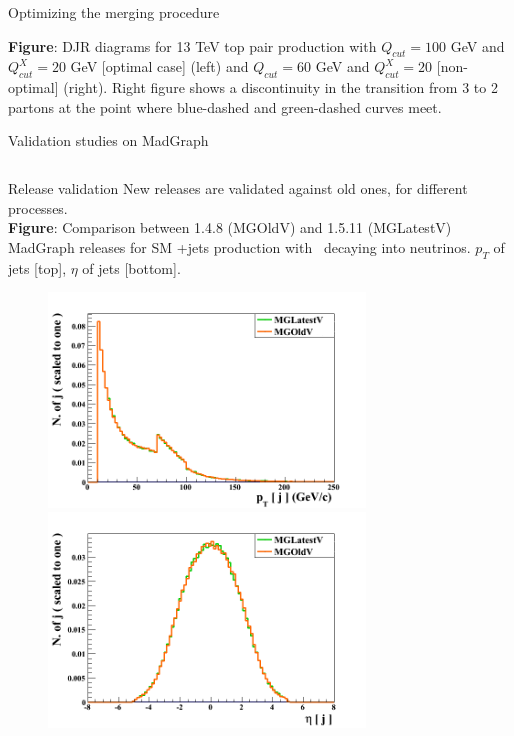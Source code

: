 \begin{frame}{Optimizing the merging procedure}
\vspace{-.2cm}
  \begin{block}{}\tiny
    \textbf{Figure}: DJR diagrams for 13 TeV top pair production with $Q_{cut}=100$ GeV and $Q^{X}_{cut}=20$ GeV [optimal case] (left) and $Q_{cut}=60$ GeV and $Q^{X}_{cut}=20$ [non-optimal] (right). Right figure shows a discontinuity in the transition from 3 to 2 partons at the point where blue-dashed and green-dashed curves meet.
  \end{block}

\end{frame}

\begin{frame}{Validation studies on MadGraph}
\vspace{-.4cm}
\begin{columns}
\begin{column}{.50\textwidth}
  \begin{block}{Release validation}\tiny
    New releases are validated against old ones, for different processes.\\
    \textbf{Figure}: Comparison between 1.4.8 (MGOldV) and 1.5.11 (MGLatestV) MadGraph releases for SM \Z+jets production with \Z~decaying into neutrinos. $p_{T}$ of jets [top], $\eta$ of jets [bottom].
  \end{block}
\vspace{-.5cm}
\begin{figure}[!Hhtbp]
  \begin{center}
    \includegraphics[width=0.75\textwidth]{../figs/ZjetsRelVal1.png}\\
    \includegraphics[width=0.75\textwidth]{../figs/ZjetsRelVal2.png}

\end{center}
\end{figure}
\end{column}
\end{columns}
\end{frame}
